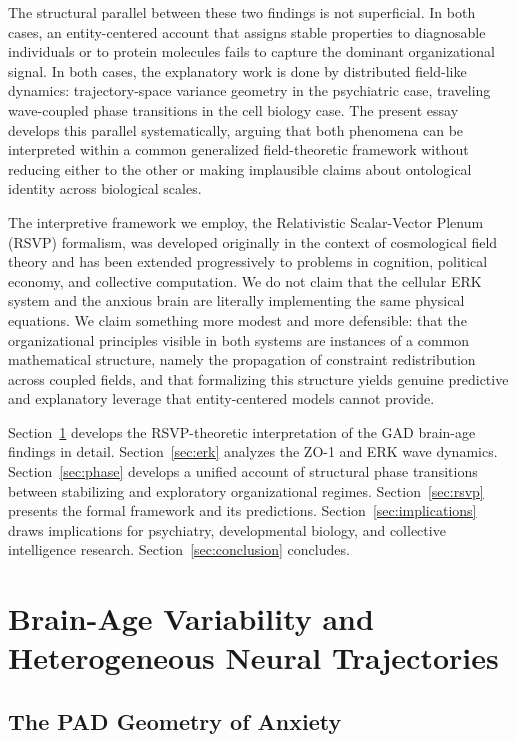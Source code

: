\documentclass[11pt,a4paper]{article}
\theoremstyle{plain}
\theoremstyle{definition}
\begin{document}
The structural parallel between these two findings is not superficial. In both cases,
an entity-centered account that assigns stable properties to diagnosable individuals or
to protein molecules fails to capture the dominant organizational signal. In both cases,
the explanatory work is done by distributed field-like dynamics: trajectory-space
variance geometry in the psychiatric case, traveling wave-coupled phase transitions in
the cell biology case. The present essay develops this parallel systematically, arguing
that both phenomena can be interpreted within a common generalized field-theoretic
framework without reducing either to the other or making implausible claims about
ontological identity across biological scales.

The interpretive framework we employ, the Relativistic Scalar-Vector Plenum (RSVP)
formalism, was developed originally in the context of cosmological field theory and has
been extended progressively to problems in cognition, political economy, and collective
computation. We do not claim that the cellular ERK system and the anxious brain are
literally implementing the same physical equations. We claim something more modest and
more defensible: that the organizational principles visible in both systems are instances
of a common mathematical structure, namely the propagation of constraint redistribution
across coupled fields, and that formalizing this structure yields genuine predictive
and explanatory leverage that entity-centered models cannot provide.

Section~\ref{sec:gad} develops the RSVP-theoretic interpretation of the GAD brain-age
findings in detail. Section~\ref{sec:erk} analyzes the ZO-1 and ERK wave dynamics.
Section~\ref{sec:phase} develops a unified account of structural phase transitions between
stabilizing and exploratory organizational regimes. Section~\ref{sec:rsvp} presents the
formal framework and its predictions. Section~\ref{sec:implications} draws implications
for psychiatry, developmental biology, and collective intelligence research. Section~\ref{sec:conclusion}
concludes.

\section{Brain-Age Variability and Heterogeneous Neural Trajectories}
\label{sec:gad}

\subsection{The PAD Geometry of Anxiety}
\end{document}
